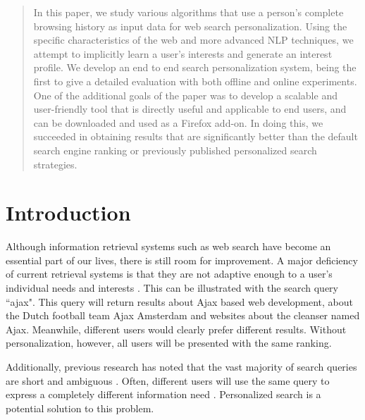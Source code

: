 \documentclass{sig-alternate}
\begin{document}
\maketitle
\begin{abstract}
In this paper, we study various algorithms that use a person's complete browsing history as input data for web search personalization. Using the specific characteristics of the web and more advanced NLP techniques, we attempt to implicitly learn a user's interests and generate an interest profile.  We develop an end to end search personalization system, being the first to give a detailed evaluation with both offline and online experiments. One of the additional goals of the paper was to develop a scalable and user-friendly tool that is directly useful and applicable to end users, and can be downloaded and used as a Firefox add-on. In doing this, we succeeded in obtaining results that are significantly better than the default search engine ranking or previously published personalized search strategies.
\end{abstract}




\section{Introduction}
Although information retrieval systems such as web search have become an essential part of our lives, there is still room for improvement. A major deficiency of current retrieval systems is that they are not adaptive enough to a user's individual needs and interests \cite{Teevan:Potential}. This can be illustrated with the search query ``ajax". This query will return results about Ajax based web development, about the Dutch football team Ajax Amsterdam and websites about the cleanser named Ajax. Meanwhile, different users would clearly prefer different results. Without personalization, however, all users will be presented with the same ranking.

Additionally, previous research has noted that the vast majority of search queries are short \cite{Silverstein:Marais, Jansen:Spink} and ambiguous \cite{Cronen:Townsend, Sanderson:Mark}. Often, different users will use the same query to express a completely different information need  \cite{Teevan:Potential, Jansen:Spink, Qiu:Cho, Shen:Tan, Teevan:Value}. Personalized search is a potential solution to this problem.
\end{document}
